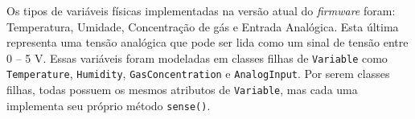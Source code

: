 Os tipos de variáveis físicas implementadas na versão atual do \textit{firmware} foram: Temperatura, Umidade, Concentração de gás e Entrada Analógica. Esta última representa uma tensão analógica que pode ser lida como um sinal de tensão entre 0 – 5 V. Essas variáveis foram modeladas em classes filhas de \texttt{Variable} como \texttt{Temperature}, \texttt{Humidity}, \texttt{GasConcentration} e \texttt{AnalogInput}. Por serem classes filhas, todas possuem os mesmos atributos de \texttt{Variable}, mas cada uma implementa seu próprio método \texttt{sense()}.